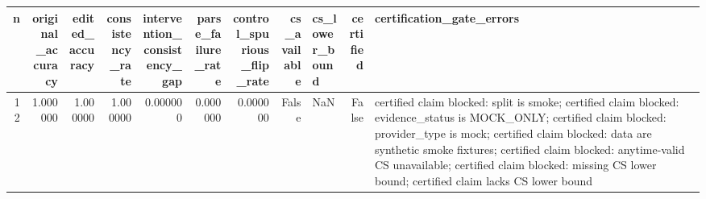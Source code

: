 \begin{tabular}{rrrrrrrrlrl}
\toprule
n & original_accuracy & edited_accuracy & consistency_rate & intervention_consistency_gap & parse_failure_rate & control_spurious_flip_rate & cs_available & cs_lower_bound & certified & certification_gate_errors \\
\midrule
12 & 1.000000 & 1.000000 & 1.000000 & 0.000000 & 0.000000 & 0.000000 & False & NaN & False & certified claim blocked: split is smoke; certified claim blocked: evidence_status is MOCK_ONLY; certified claim blocked: provider_type is mock; certified claim blocked: data are synthetic smoke fixtures; certified claim blocked: anytime-valid CS unavailable; certified claim blocked: missing CS lower bound; certified claim lacks CS lower bound \\
\bottomrule
\end{tabular}
